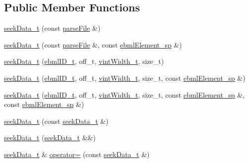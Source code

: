 \subsection*{Public Member Functions}
\begin{DoxyCompactItemize}
\item 
\mbox{\hyperlink{classebml_1_1seekData__t_a985802e7677dbec9e039baa983cd2bfc}{seek\+Data\+\_\+t}} (const \mbox{\hyperlink{classebml_1_1parseFile}{parse\+File}} \&)
\item 
\mbox{\hyperlink{classebml_1_1seekData__t_a2d31b7abe74496f503aff01c50b18053}{seek\+Data\+\_\+t}} (const \mbox{\hyperlink{classebml_1_1parseFile}{parse\+File}} \&, const \mbox{\hyperlink{namespaceebml_adad533b7705a16bb360fe56380c5e7be}{ebml\+Element\+\_\+sp}} \&)
\item 
\mbox{\hyperlink{classebml_1_1seekData__t_a080c97211758dcec4045e5e08427cdb1}{seek\+Data\+\_\+t}} (\mbox{\hyperlink{namespaceebml_a86c5f604ddf12a74aa9812e997a58691}{ebml\+I\+D\+\_\+t}}, off\+\_\+t, \mbox{\hyperlink{namespaceebml_a2ccdfb60b23efb51fe07f9d066e23604}{vint\+Width\+\_\+t}}, size\+\_\+t)
\item 
\mbox{\hyperlink{classebml_1_1seekData__t_ad64e95299ca85c695b33eb8230cbe48c}{seek\+Data\+\_\+t}} (\mbox{\hyperlink{namespaceebml_a86c5f604ddf12a74aa9812e997a58691}{ebml\+I\+D\+\_\+t}}, off\+\_\+t, \mbox{\hyperlink{namespaceebml_a2ccdfb60b23efb51fe07f9d066e23604}{vint\+Width\+\_\+t}}, size\+\_\+t, const \mbox{\hyperlink{namespaceebml_adad533b7705a16bb360fe56380c5e7be}{ebml\+Element\+\_\+sp}} \&)
\item 
\mbox{\hyperlink{classebml_1_1seekData__t_a4073e066b0e82681eb486e249a5a3ed2}{seek\+Data\+\_\+t}} (\mbox{\hyperlink{namespaceebml_a86c5f604ddf12a74aa9812e997a58691}{ebml\+I\+D\+\_\+t}}, off\+\_\+t, \mbox{\hyperlink{namespaceebml_a2ccdfb60b23efb51fe07f9d066e23604}{vint\+Width\+\_\+t}}, size\+\_\+t, const \mbox{\hyperlink{namespaceebml_adad533b7705a16bb360fe56380c5e7be}{ebml\+Element\+\_\+sp}} \&, const \mbox{\hyperlink{namespaceebml_adad533b7705a16bb360fe56380c5e7be}{ebml\+Element\+\_\+sp}} \&)
\item 
\mbox{\hyperlink{classebml_1_1seekData__t_a8df38b86c02a5cc3491970ae48605a29}{seek\+Data\+\_\+t}} (const \mbox{\hyperlink{classebml_1_1seekData__t}{seek\+Data\+\_\+t}} \&)
\item 
\mbox{\hyperlink{classebml_1_1seekData__t_a19592a08f48414ada236b0264be6c3b6}{seek\+Data\+\_\+t}} (\mbox{\hyperlink{classebml_1_1seekData__t}{seek\+Data\+\_\+t}} \&\&)
\item 
\mbox{\hyperlink{classebml_1_1seekData__t}{seek\+Data\+\_\+t}} \& \mbox{\hyperlink{classebml_1_1seekData__t_a9ecc0247b6026b2cfd055b302a620166}{operator=}} (const \mbox{\hyperlink{classebml_1_1seekData__t}{seek\+Data\+\_\+t}} \&)

\end{DoxyCompactItemize}
